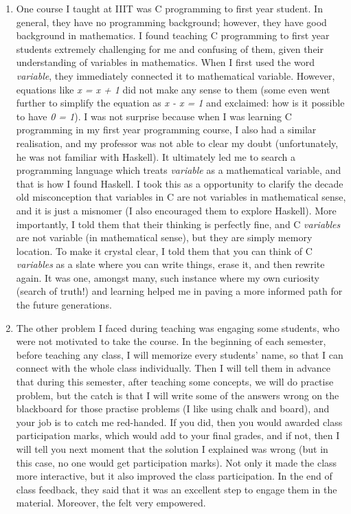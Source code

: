 \documentclass[a4paper]{article}
\begin{document}
\begin{enumerate}
  \item One course I taught at IIIT was C programming to first year student. In general, they have no programming 
  background; however, they have good background in mathematics. I found teaching C programming to first year
  students extremely challenging for me and confusing of them, given their understanding of 
  variables in mathematics. When I first used the word
  \textit{variable}, they immediately connected it to mathematical variable. However, equations like  \textit{x = x + 1} 
  did not make any sense to them (some even went further to simplify the equation as \textit{x - x = 1} and 
  exclaimed: how is it possible to have \textit{0 = 1}). I was not surprise because when I was learning C programming
  in my first year programming course,  I also had a similar realisation, and  my professor was not able to clear my 
  doubt (unfortunately, he was not familiar with Haskell). It
 ultimately led me to search a programming language which treats \textit{variable} as a mathematical 
 variable, and that is how I found Haskell. 
 I took this as a opportunity to clarify the decade old misconception that variables in C are not variables 
 in mathematical sense, and it is just a misnomer (I also encouraged them to explore Haskell). 
 More importantly, I told them that their thinking is perfectly fine, and C \textit{variables} are not variable (in mathematical 
 sense), but they are simply memory location. To make it crystal clear, I told them that you can think of 
 C \textit{variables} as a slate where you can write things, erase it, and then rewrite again. It was one, amongst many, such instance
 where my own curiosity (search of truth!) and learning helped me in paving a more informed path for the future generations. 
  
  
  \item The other problem I faced during teaching was engaging some students, who were not motivated 
  to take the course. In the beginning of each semester, 
  before teaching any class, I will memorize every students' name, so that I can connect with the whole class individually. 
  Then I will tell them in advance that during this semester, after teaching some concepts, we will do practise problem,  but 
  the catch is that I will write some of the answers wrong on the blackboard for those practise problems (I like using 
  chalk and board), and your job is to catch me red-handed.
   If you did, then you would awarded class participation 
  marks, which would add to your final grades, and if not, then I will tell you next moment that the solution I explained was wrong 
  (but in this case, no one would get participation marks).  
  Not only it made the class more interactive, but it also improved 
  the class participation. In the end of class feedback, they said that it was an excellent step to engage them in the 
  material.  Moreover, the felt very empowered. 
   

\end{enumerate}
\end{document}
